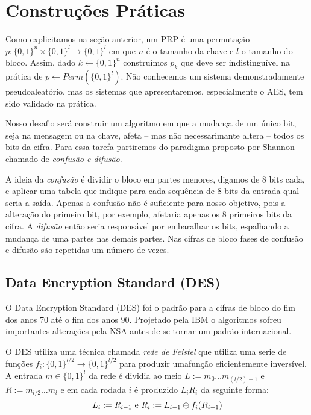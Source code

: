 \section{Construções Práticas}
\label{sec:construcoes-praticas}
Como explicitamos na seção anterior, um PRP é uma permutação $p: \{0,1\}^n \times \{0,1\}^l \to \{0,1\}^l$ em que $n$ é o tamanho da chave e $l$ o tamanho do bloco.
Assim, dado $k \leftarrow \{0,1\}^n$ construímos $p_k$ que deve ser indistinguível na prática de $p \leftarrow Perm(\{0,1\}^l)$.
Não conhecemos um sistema demonstradamente pseudoaleatório, mas os sistemas que apresentaremos, especialmente o AES, tem sido validado na prática.

Nosso desafio será construir um algoritmo em que a mudança de um único bit, seja na mensagem ou na chave, afeta -- mas não necessarimante altera -- todos os bits da cifra.
Para essa tarefa partiremos do paradigma proposto por Shannon chamado de {\em confusão e difusão}.

A ideia da {\em confusão} é dividir o bloco em partes menores, digamos de 8 bits cada, e aplicar uma tabela que indique para cada sequência de 8 bits da entrada qual seria a saída.
Apenas a confusão não é suficiente para nosso objetivo, pois a alteração do primeiro bit, por exemplo, afetaria apenas os 8 primeiros bits da cifra.
A {\em difusão} então seria responsável por embaralhar os bits, espalhando a mudança de uma partes nas demais partes.
Nas cifras de bloco fases de confusão e difusão são repetidas um número de vezes.

\subsection{Data Encryption Standard (DES)}
\label{sec:des}

O Data Encryption Standard (DES) foi o padrão para a cifras de bloco do fim dos anos 70 até o fim dos anos 90.
Projetado pela IBM o algoritmos sofreu importantes alterações pela NSA antes de se tornar um padrão internacional.

O DES utiliza uma técnica chamada {\em rede de Feistel} que utiliza uma serie de funções $f_i:\{0,1\}^{l/2} \to \{0,1\}^{l/2}$ para produzir umafunção eficientemente inversível.
A entrada $m \in \{0,1\}^l$ da rede é dividia ao meio $L := m_0 \dots m_{(l/2)-1}$ e $R := m_{l/2} \dots m_l$ e em cada rodada $i$ é produzido $L_iR_i$ da seguinte forma:
\begin{displaymath}
  L_i := R_{i-1} \textrm{ e } R_i := L_{i-1} \oplus f_i(R_{i-1})
\end{displaymath}

